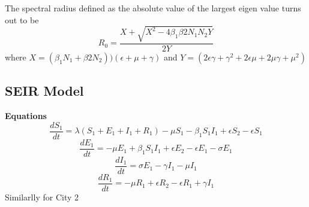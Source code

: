 \documentclass[14pt]{article}
\begin{document}
The spectral radius defined as the absolute value of the largest eigen value turns out to be
$$R_{0}=\frac{X+\sqrt{X^{2}-4\beta_{1}\beta{2}N_{1}N_{2}Y}}{2Y}$$ where $X=(\beta_{1} N_{1}+\beta{2} N_{2}))(\epsilon+\mu+\gamma)$ and $Y=(2 \epsilon \gamma+\gamma^{2}+2 \epsilon \mu+ 2 \mu \gamma+ \mu^{2})$

\subsection{SEIR Model}
\textbf{Equations} \newline
$$\frac{dS_{1}}{dt}=\lambda(S_{1}+E_{1}+I_{1}+R_{1}) -\mu  S_{1} - \beta_{1} S_{1}I_{1}  + \epsilon S_{2} -\epsilon S_{1} $$
$$\frac{dE_{1}}{dt}= -\mu  E_{1} + \beta_{1} S_{1}I_{1}  + \epsilon E_{2} -\epsilon E_{1} -\sigma  E_{1} $$
$$\frac{dI_{1}}{dt}= \sigma E_{1} -\gamma I_{1} -\mu I_{1}$$
$$\frac{dR_{1}}{dt}= -\mu  R_{1} +  \epsilon R_{2} -\epsilon R_{1} +\gamma I_{1} $$
Similarlly for City 2
\end{document}
